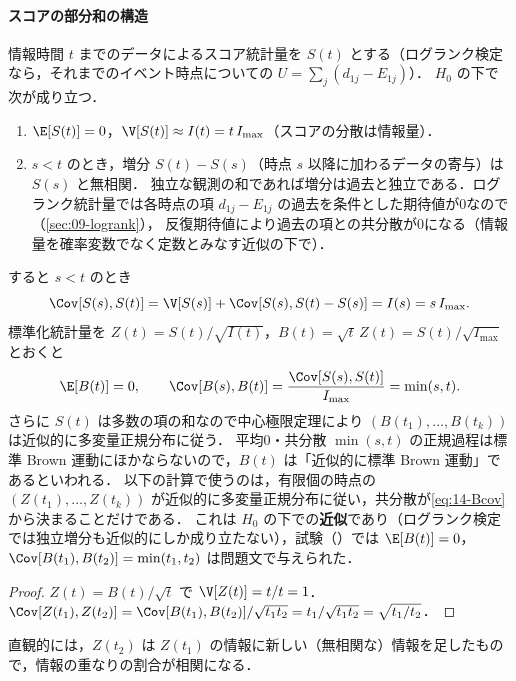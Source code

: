 \paragraph{スコアの部分和の構造}
情報時間 $t$ までのデータによるスコア統計量を $S(t)$ とする（ログランク検定なら，それまでのイベント時点についての $U=\sum_j(d_{1j}-E_{1j})$）．
$H_0$ の下で次が成り立つ．
\begin{enumerate}[label=(\roman*)]
\item $\E[S(t)]=0$，$\V[S(t)]\approx I(t)=t\,I_{\max}$（スコアの分散は情報量）．
\item $s<t$ のとき，増分 $S(t)-S(s)$（時点 $s$ 以降に加わるデータの寄与）は $S(s)$ と無相関．
      独立な観測の和であれば増分は過去と独立である．ログランク統計量では各時点の項 $d_{1j}-E_{1j}$ の過去を条件とした期待値が0なので（\cref{sec:09-logrank}），
      反復期待値により過去の項との共分散が0になる（情報量を確率変数でなく定数とみなす近似の下で）．
\end{enumerate}
すると $s<t$ のとき
\[
\Cov[S(s),S(t)]=\V[S(s)]+\Cov[S(s),S(t)-S(s)]=I(s)=s\,I_{\max}.
\]
標準化統計量を $Z(t)=S(t)/\sqrt{I(t)}$，$B(t)=\sqrt t\,Z(t)=S(t)/\sqrt{I_{\max}}$ とおくと
\begin{equation}
\E[B(t)]=0,\qquad \Cov[B(s),B(t)]=\frac{\Cov[S(s),S(t)]}{I_{\max}}=\min(s,t).\label{eq:14-Bcov}
\end{equation}
さらに $S(t)$ は多数の項の和なので中心極限定理により $(B(t_1),\dots,B(t_k))$ は近似的に多変量正規分布に従う．
平均0・共分散 $\min(s,t)$ の正規過程は標準 Brown 運動にほかならないので，$B(t)$ は「近似的に標準 Brown 運動」であるといわれる．
以下の計算で使うのは，有限個の時点の $(Z(t_1),\dots,Z(t_k))$ が近似的に多変量正規分布に従い，共分散が\cref{eq:14-Bcov}から決まることだけである．
\Youchui これは $H_0$ の下での\textbf{近似}であり（ログランク検定では独立増分も近似的にしか成り立たない），試験（）では $\E[B(t)]=0$，$\Cov[B(t_1),B(t_2)]=\min(t_1,t_2)$ は問題文で与えられた．

\begin{proof}
$Z(t)=B(t)/\sqrt t$ で $\V[Z(t)]=t/t=1$．$\Cov[Z(t_1),Z(t_2)]=\Cov[B(t_1),B(t_2)]/\sqrt{t_1t_2}=t_1/\sqrt{t_1t_2}=\sqrt{t_1/t_2}$．
\end{proof}
直観的には，$Z(t_2)$ は $Z(t_1)$ の情報に新しい（無相関な）情報を足したもので，情報の重なりの割合が相関になる．

